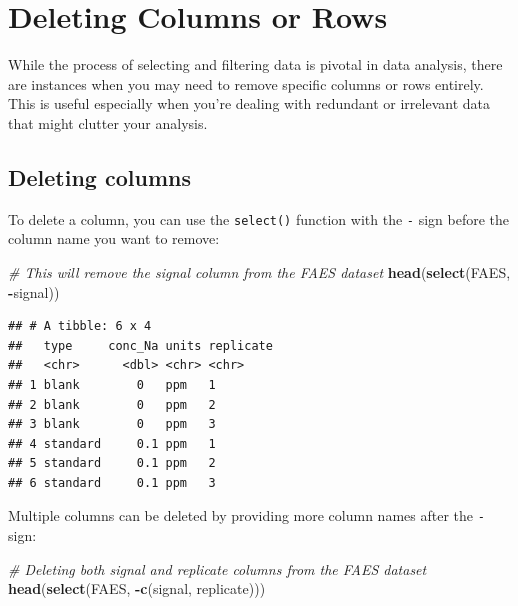 \documentclass[
]{book}
\newenvironment{Shaded}{\begin{snugshade}}{\end{snugshade}}
\newcommand{\CommentTok}[1]{\textcolor[rgb]{0.56,0.35,0.01}{\textit{#1}}}
\newcommand{\FunctionTok}[1]{\textcolor[rgb]{0.13,0.29,0.53}{\textbf{#1}}}
\newcommand{\NormalTok}[1]{#1}
\newcommand{\SpecialCharTok}[1]{\textcolor[rgb]{0.81,0.36,0.00}{\textbf{#1}}}
\begin{document}
\hypertarget{deleting-columns-or-rows}{%
\section{Deleting Columns or Rows}\label{deleting-columns-or-rows}}

While the process of selecting and filtering data is pivotal in data analysis, there are instances when you may need to remove specific columns or rows entirely. This is useful especially when you're dealing with redundant or irrelevant data that might clutter your analysis.

\hypertarget{deleting-columns}{%
\subsection{Deleting columns}\label{deleting-columns}}

To delete a column, you can use the \texttt{select()} function with the \texttt{-} sign before the column name you want to remove:

\begin{Shaded}
\begin{Highlighting}[]
\CommentTok{\# This will remove the \textquotesingle{}signal\textquotesingle{} column from the FAES dataset}
\FunctionTok{head}\NormalTok{(}\FunctionTok{select}\NormalTok{(FAES, }\SpecialCharTok{{-}}\NormalTok{signal))}
\end{Highlighting}
\end{Shaded}

\begin{verbatim}
## # A tibble: 6 x 4
##   type     conc_Na units replicate
##   <chr>      <dbl> <chr> <chr>    
## 1 blank        0   ppm   1        
## 2 blank        0   ppm   2        
## 3 blank        0   ppm   3        
## 4 standard     0.1 ppm   1        
## 5 standard     0.1 ppm   2        
## 6 standard     0.1 ppm   3
\end{verbatim}

Multiple columns can be deleted by providing more column names after the \texttt{-} sign:

\begin{Shaded}
\begin{Highlighting}[]
\CommentTok{\# Deleting both \textquotesingle{}signal\textquotesingle{} and \textquotesingle{}replicate\textquotesingle{} columns from the FAES dataset}
\FunctionTok{head}\NormalTok{(}\FunctionTok{select}\NormalTok{(FAES, }\SpecialCharTok{{-}}\FunctionTok{c}\NormalTok{(signal, replicate)))}
\end{Highlighting}
\end{Shaded}
\end{document}
